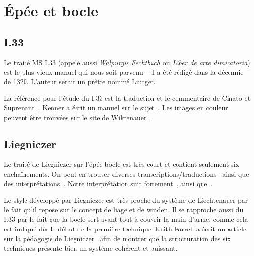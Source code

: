 \chapter{Épée et bocle}





\section{I.33}



Le traité MS I.33 (appelé aussi \emph{Walpurgis Fechtbuch} ou \emph{Liber de arte dimicatoria}) est le plus vieux manuel qui nous soit parvenu – il a été rédigé dans la décennie de 1320.
L'auteur serait un prêtre nommé Liutger.

La référence pour l'étude du I.33 est la traduction et le commentaire de Cinato et Suprenant~\cite{cinato:I33:2009}.
Kenner a écrit un manuel sur le sujet~\cite{kenner:I33:2014}.
Les images en couleur peuvent être trouvées sur le site de Wiktenauer~\cite{wiktenauer:I33}.




\section{Liegniczer}



Le traité de Liegniczer sur l'épée-bocle est très court et contient seulement six enchaînements.
On peut en trouver diverses transcriptions/traductions~\cite{ardamhe:liegniczer, farrell:liegnieczer, lindholm:ringeck_others:2006} ainsi que des interprétations~\cite{farrell:pedagogy_liegnieczer:2014, youtube:sala_armi:liegniczer, youtube:memag:liegniczer, lindholm:ringeck_others:2006, Myers:LiegniczerBuckler, knight:epee_bocle}.
Notre interprétation suit fortement~\cite{youtube:sala_armi:liegniczer, farrell:pedagogy_liegnieczer:2014}, ainsi que~\cite{youtube:memag:liegniczer}.

Le style développé par Liegniczer est très proche du système de Liechtenauer par le fait qu'il repose sur le concept de liage et de winden.
Il se rapproche aussi du I.33 par le fait que la bocle sert avant tout à couvrir la main d'arme, comme cela est indiqué dès le début de la première technique.
Keith Farrell a écrit un article sur la pédagogie de Liegniczer~\cite{farrell:pedagogy_liegnieczer:2014} afin de montrer que la structuration des six techniques présente bien un système cohérent et puissant.

